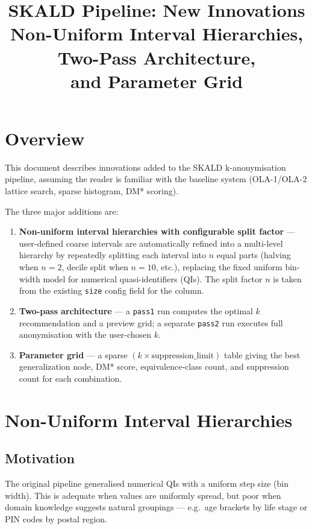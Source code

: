 \documentclass[12pt,a4paper]{article}
\title{\textbf{SKALD Pipeline: New Innovations}\\[0.5em]
\large Non-Uniform Interval Hierarchies, Two-Pass Architecture, \\ and Parameter Grid}
\author{}
\date{}
\begin{document}
\maketitle
\tableofcontents
\newpage

\section{Overview}

This document describes innovations added to the SKALD k-anonymisation pipeline,
assuming the reader is familiar with the baseline system (OLA-1/OLA-2 lattice
search, sparse histogram, DM* scoring).

The three major additions are:
\begin{enumerate}
  \item \textbf{Non-uniform interval hierarchies with configurable split factor} — user-defined
        coarse intervals are automatically refined into a multi-level hierarchy by
        repeatedly splitting each interval into $n$ equal parts (halving when $n{=}2$,
        decile split when $n{=}10$, etc.), replacing the fixed uniform bin-width model
        for numerical quasi-identifiers (QIs).  The split factor $n$ is taken from
        the existing \texttt{size} config field for the column.
  \item \textbf{Two-pass architecture} — a \texttt{pass1} run computes the
        optimal $k$ recommendation and a preview grid; a separate \texttt{pass2}
        run executes full anonymisation with the user-chosen $k$.
  \item \textbf{Parameter grid} — a sparse $(k \times \text{suppression\_limit})$
        table giving the best generalization node, DM* score, equivalence-class
        count, and suppression count for each combination.
\end{enumerate}

\section{Non-Uniform Interval Hierarchies}

\subsection{Motivation}

The original pipeline generalised numerical QIs with a uniform step size
(bin width). This is adequate when values are uniformly spread, but poor when
domain knowledge suggests natural groupings — e.g.\ age brackets by life stage
or PIN codes by postal region.
\end{document}
